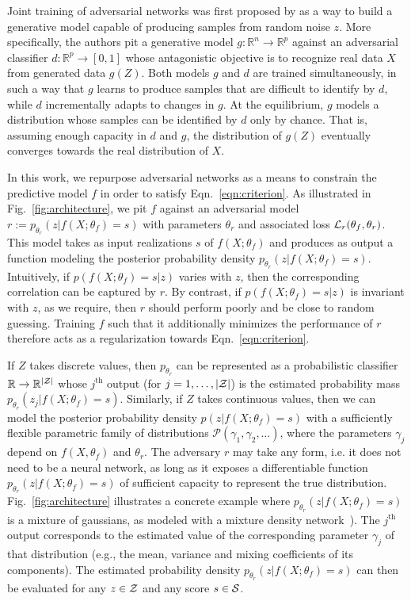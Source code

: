 \documentclass{article}
\theoremstyle{plain}
\begin{document}
Joint training of adversarial networks was first proposed by \citep{goodfellow2014generative} as a
way to build a generative model capable of producing samples from random noise
$z$. More specifically, the authors pit a generative model $g:
\mathbb{R}^n \to \mathbb{R}^p$ against an adversarial classifier $d :
\mathbb{R}^p \to [0, 1]$ whose antagonistic objective is to recognize
real data $X$ from generated data $g(Z)$. Both models $g$ and $d$ are trained
simultaneously, in such a way that $g$ learns to produce samples that are
difficult to identify by $d$, while $d$ incrementally adapts to changes in $g$.
At the equilibrium, $g$ models a distribution whose samples can be identified by
$d$ only by chance. That is, assuming enough capacity in $d$ and  $g$, the
distribution of $g(Z)$ eventually converges towards the real distribution
of $X$.

In this work, we repurpose adversarial networks as a means to constrain the
predictive model $f$ in order to satisfy Eqn.~\ref{eqn:criterion}. As
illustrated in Fig.~\ref{fig:architecture}, we pit $f$ against an adversarial
model $r := p_{\theta_r}(z | f(X;\theta_f)=s)$ with parameters $\theta_r$ and
associated loss ${\cal L}_r(\theta_f, \theta_r)$. This model takes  as input
realizations $s$ of $f(X; \theta_f)$ and produces as output a function
modeling the posterior probability density $p_{\theta_r}(z | f(X;\theta_f)=s)$.
Intuitively, if $p(f(X; \theta_f)=s|z)$ varies with $z$,
then the corresponding correlation can be captured by $r$. By contrast, if
$p(f(X; \theta_f)=s|z)$ is invariant with $z$, as we require, then $r$ should
perform poorly and be close to random guessing. Training $f$ such that it
additionally minimizes the performance of $r$ therefore acts as a regularization
towards Eqn.~\ref{eqn:criterion}.

If $Z$ takes discrete values, then $p_{\theta_r}$ can be represented as a
probabilistic classifier $\mathbb{R} \to \mathbb{R}^{|{\cal Z|}}$ whose
$j^\textrm{th}$ output (for $j=1, \dots, |{\cal Z}|$) is the estimated probability mass
$p_{\theta_r}(z_j|f(X;\theta_f)=s)$. Similarly, if $Z$ takes continuous values,
then we can model the posterior probability density $p(z | f(X;\theta_f)=s)$
with a sufficiently flexible  parametric family of distributions $\mathcal{P}(\gamma_1, \gamma_2, \dots)$,
where the parameters $\gamma_j$ depend on $f(X, \theta_f)$ and $\theta_r$.
The adversary $r$ may
take any form, i.e. it does not need to be a neural network, as long as it exposes a
differentiable function $p_{\theta_r}(z|f(X;\theta_f)=s)$ of sufficient capacity
to represent the true distribution. Fig.~\ref{fig:architecture} illustrates
a concrete example where $p_{\theta_r}(z | f(X;\theta_f)=s)$ is a mixture of
gaussians, as modeled with a mixture density network~\citep{bishop1994mixture}).
The $j^\textrm{th}$ output corresponds to the estimated value of the
corresponding parameter $\gamma_j$ of that distribution (e.g., the mean,
variance and mixing coefficients of its components). The estimated probability density
$p_{\theta_r}(z|f(X;\theta_f)=s)$ can then be evaluated for any $z \in {\cal Z}$ and any score $s \in {\cal S}$.
\end{document}
